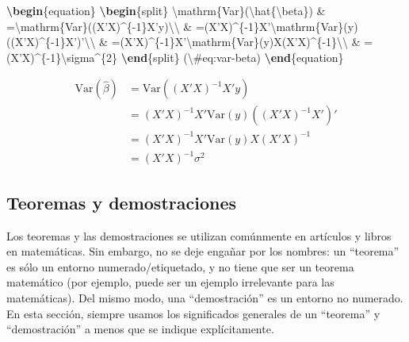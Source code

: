 \documentclass[12pt,]{krantz}
\makeatletter
\newenvironment{Shaded}{\begin{snugshade}}{\end{snugshade}}
\newcommand{\KeywordTok}[1]{\textcolor[rgb]{0.13,0.29,0.53}{\textbf{#1}}}
\newcommand{\SpecialCharTok}[1]{\textcolor[rgb]{0.00,0.00,0.00}{#1}}
\newcommand{\SpecialStringTok}[1]{\textcolor[rgb]{0.31,0.60,0.02}{#1}}
\newcommand{\ExtensionTok}[1]{#1}
\newcommand{\NormalTok}[1]{#1}
\newenvironment{kframe}{%
\medskip{}
\setlength{\fboxsep}{.8em}
 \def\at@end@of@kframe{}%
 \ifinner\ifhmode%
  \def\at@end@of@kframe{\end{minipage}}%
  \begin{minipage}{\columnwidth}%
 \fi\fi%
 \def\FrameCommand##1{\hskip\@totalleftmargin \hskip-\fboxsep
 \colorbox{shadecolor}{##1}\hskip-\fboxsep
     \hskip-\linewidth \hskip-\@totalleftmargin \hskip\columnwidth}%
 \MakeFramed {\advance\hsize-\width
   \@totalleftmargin\z@ \linewidth\hsize
   \@setminipage}}%
 {\par\unskip\endMakeFramed%
 \at@end@of@kframe}
\renewenvironment{Shaded}{\begin{kframe}}{\end{kframe}}
\theoremstyle{definition}
\theoremstyle{definition}
\theoremstyle{definition}
\theoremstyle{remark}
\makeatother
\begin{document}
\begin{Shaded}
\begin{Highlighting}[]
\KeywordTok{\textbackslash{}begin}\NormalTok{\{}\ExtensionTok{equation}\NormalTok{\}}\SpecialStringTok{ }
\KeywordTok{\textbackslash{}begin}\NormalTok{\{}\ExtensionTok{split}\NormalTok{\}}
\SpecialCharTok{\textbackslash{}mathrm}\SpecialStringTok{\{Var\}(}\SpecialCharTok{\textbackslash{}hat}\SpecialStringTok{\{}\SpecialCharTok{\textbackslash{}beta}\SpecialStringTok{\}) & =}\SpecialCharTok{\textbackslash{}mathrm}\SpecialStringTok{\{Var\}((X'X)^\{-1\}X'y)}\SpecialCharTok{\textbackslash{}\textbackslash{}}
\SpecialStringTok{ & =(X'X)^\{-1\}X'}\SpecialCharTok{\textbackslash{}mathrm}\SpecialStringTok{\{Var\}(y)((X'X)^\{-1\}X')'}\SpecialCharTok{\textbackslash{}\textbackslash{}}
\SpecialStringTok{ & =(X'X)^\{-1\}X'}\SpecialCharTok{\textbackslash{}mathrm}\SpecialStringTok{\{Var\}(y)X(X'X)^\{-1\}}\SpecialCharTok{\textbackslash{}\textbackslash{}}
\SpecialStringTok{ & =(X'X)^\{-1\}}\SpecialCharTok{\textbackslash{}sigma}\SpecialStringTok{^\{2\}}
\KeywordTok{\textbackslash{}end}\NormalTok{\{}\SpecialStringTok{split\}}
\SpecialStringTok{(}\SpecialCharTok{\textbackslash{}#}\SpecialStringTok{eq:var-beta)}
\KeywordTok{\textbackslash{}end}\NormalTok{\{}\ExtensionTok{equation}\NormalTok{\} }
\end{Highlighting}
\end{Shaded}

\begin{equation}
\begin{split}
\mathrm{Var}(\hat{\beta}) & =\mathrm{Var}((X'X)^{-1}X'y)\\
 & =(X'X)^{-1}X'\mathrm{Var}(y)((X'X)^{-1}X')'\\
 & =(X'X)^{-1}X'\mathrm{Var}(y)X(X'X)^{-1}\\
 & =(X'X)^{-1}\sigma^{2}
\end{split}
\label{eq:var-beta}
\end{equation}

\subsection{Teoremas y demostraciones}\label{teoremas}

Los teoremas y las demostraciones se utilizan comúnmente en artículos y
libros en matemáticas. Sin embargo, no se deje engañar por los nombres:
un ``teorema'' es sólo un entorno numerado/etiquetado, y no tiene que
ser un teorema matemático (por ejemplo, puede ser un ejemplo irrelevante
para las matemáticas). Del mismo modo, una ``demostración'' es un
entorno no numerado. En esta sección, siempre usamos los significados
generales de un ``teorema'' y ``demostración'' a menos que se indique
explícitamente.
\end{document}
